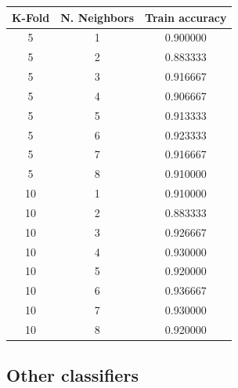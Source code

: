 \documentclass{article}
\begin{document}
\begin{table}[htb]
\begin{tabular}{|c|c|c|}
\hline
\textbf{K-Fold} & \textbf{N. Neighbors} & \textbf{Train accuracy} \\ \hline
5               & 1           & 0.900000           \\ \hline
5               & 2           & 0.883333           \\ \hline
5               & 3           & 0.916667           \\ \hline
5               & 4           & 0.906667           \\ \hline
5               & 5           & 0.913333           \\ \hline
5               & 6           & 0.923333           \\ \hline
5               & 7           & 0.916667           \\ \hline
5               & 8           & 0.910000           \\ \hline
10              & 1           & 0.910000           \\ \hline
10              & 2           & 0.883333           \\ \hline
10              & 3           & 0.926667           \\ \hline
10              & 4           & 0.930000           \\ \hline
10              & 5           & 0.920000           \\ \hline
\rowcolor[HTML]{34FF34}
10              & 6           & 0.936667           \\ \hline
10              & 7           & 0.930000           \\ \hline
10              & 8           & 0.920000           \\ \hline
\end{tabular}
\end{table}

\subsection{Other classifiers}
\end{document}
